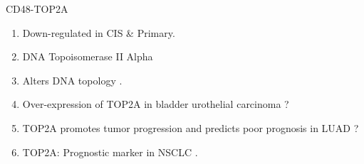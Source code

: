 \documentclass{beamer}
\begin{document}
\begin{frame}[allowframebreaks]
        \begin{block}{CD48-TOP2A}
            \begin{enumerate}
                \item Down-regulated in CIS \& Primary.
                \item DNA Topoisomerase II Alpha
                \item Alters DNA topology \cite{TOP2A-1}.
                \item Over-expression of TOP2A in bladder urothelial carcinoma \cite{TOP2A-2} ?
                \item TOP2A promotes tumor progression and predicts poor prognosis in LUAD \cite{TOP2A-3} ?
                \item TOP2A: Prognostic marker in NSCLC \cite{TOP2A-4}.
            \end{enumerate}
        \end{block}
    \end{frame}
\end{document}
